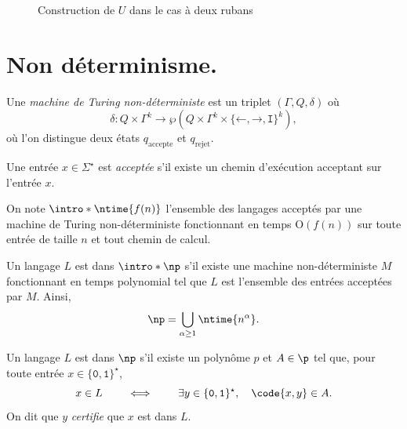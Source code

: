 \documentclass[./main]{subfiles}
\begin{document}
  \begin{figure}
    \centering
    \caption{Construction de $U$ dans le cas à deux rubans}
    \label{fig:univ-constr}
  \end{figure}

  \section{Non déterminisme.}

  \begin{defn}
    Une \textit{machine de Turing non-déterministe} est un triplet $(\Gamma, Q, \delta)$ où
    \[
    \delta : Q \times \Gamma^k \to \wp(Q \times \Gamma^k \times \{\texttt{←}, \texttt{→}, \texttt{I}\}^k)
    ,\]
    où l'on distingue deux états $q_\text{accepte}$ et $q_\text{rejet}$.

    Une entrée $x \in \Sigma^\star$ est \textit{acceptée} s'il existe un chemin d'exécution acceptant sur l'entrée $x$.
  \end{defn}

  \begin{defn}
    On note $\intro*\ntime{f(n)}$ l'ensemble des langages acceptés par une machine de Turing non-déterministe fonctionnant en temps $\mathrm{O}(f(n))$ sur toute entrée de taille $n$ et tout chemin de calcul.
  \end{defn}

  \begin{defn}
    Un langage $L$ est dans $\intro*\np$ s'il existe une machine non-déterministe  $M$ fonctionnant en temps polynomial tel que $L$ est l'ensemble des entrées acceptées par $M$.
    Ainsi,
    \[
      \np = \bigcup_{\alpha \ge 1} \ntime{n^\alpha}
    .\]
  \end{defn}

  \begin{thm}
    Un langage $L$ est dans $\np$ s'il existe un polynôme $p$ et $A \in \p$ tel que, pour toute entrée $x \in \{\texttt{0}, \texttt{1}\}^\star$,
    \[
      x \in L \quad\quad \iff \quad\quad \exists y \in \{\texttt{0}, \texttt{1}\}^\star, \quad \code{x,y} \in A
    .\]
    On dit que $y$ \textit{certifie} que $x$ est dans $L$.
  \end{thm}
\end{document}
